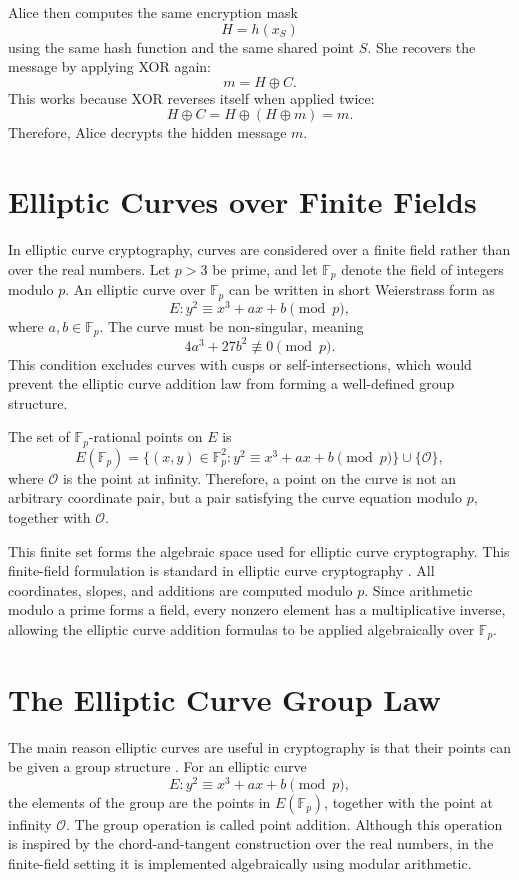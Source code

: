 \documentclass[12pt,a4paper]{article}
\begin{document}
Alice then computes the same encryption mask
\[H=h(x_S)\]
using the same hash function and the same shared point \(S\). She recovers the message by applying XOR again:
\[m=H\oplus C.\]
This works because XOR reverses itself when applied twice:
\[H\oplus C=H\oplus(H\oplus m)=m.\]
Therefore, Alice decrypts the hidden message \(m\).

\section{Elliptic Curves over Finite Fields}

In elliptic curve cryptography, curves are considered over a finite field rather than over the real numbers. Let \(p>3\) be prime, and let \(\mathbb{F}_p\) denote the field of integers modulo \(p\). An elliptic curve over \(\mathbb{F}_p\) can be written in short Weierstrass form as
\[E: y^2 \equiv x^3 + ax + b \pmod p,\]
where \(a,b \in \mathbb{F}_p\). The curve must be non-singular, meaning
\[4a^3 + 27b^2 \not\equiv 0 \pmod p.\]
This condition excludes curves with cusps or self-intersections, which would prevent the elliptic curve addition law from forming a well-defined group structure.

The set of \(\mathbb{F}_p\)-rational points on \(E\) is
\[E(\mathbb{F}_p)=\{(x,y) \in \mathbb{F}_p^2 : y^2 \equiv x^3 + ax + b \pmod p\}\cup\{\mathcal{O}\},\]
where \(\mathcal{O}\) is the point at infinity. Therefore, a point on the curve is not an arbitrary coordinate pair, but a pair satisfying the curve equation modulo \(p\), together with \(\mathcal{O}\).

This finite set forms the algebraic space used for elliptic curve cryptography. This finite-field formulation is standard in elliptic curve cryptography \cite{washington2008,trappe-washington2006}. All coordinates, slopes, and additions are computed modulo \(p\). Since arithmetic modulo a prime forms a field, every nonzero element has a multiplicative inverse, allowing the elliptic curve addition formulas to be applied algebraically over \(\mathbb{F}_p\).

\section{The Elliptic Curve Group Law}

The main reason elliptic curves are useful in cryptography is that their points can be given a group structure \cite{washington2008,mckean-moll1997}. For an elliptic curve
\[E: y^2 \equiv x^3 + ax + b \pmod p,\]
the elements of the group are the points in \(E(\mathbb{F}_p)\), together with the point at infinity \(\mathcal{O}\). The group operation is called point addition. Although this operation is inspired by the chord-and-tangent construction over the real numbers, in the finite-field setting it is implemented algebraically using modular arithmetic.
\end{document}
